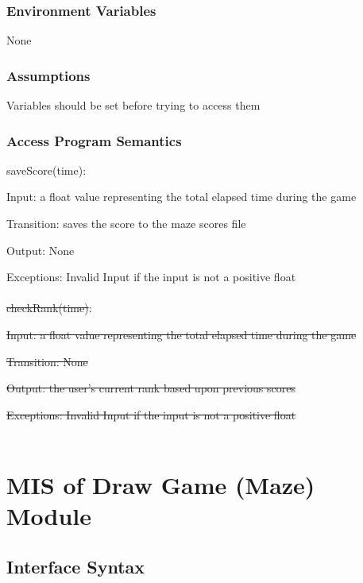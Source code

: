 \documentclass[12pt, titlepage]{article}
\begin{document}
		\subsubsection{Environment Variables}
		None
		\subsubsection{Assumptions}
		Variables should be set before trying to access them
		
		\subsubsection{Access Program Semantics}
		saveScore(time):
		
		Input: a float value representing the total elapsed time during the game
		
		Transition: saves the score to the maze scores file
		
		Output: None
		
		Exceptions: Invalid Input if the input is not a positive float \\
		\\
		\sout{checkRank(time)}:
		
		\sout{Input: a float value representing the total elapsed time during the game}
		
		\sout{Transition: None}
		
		\sout{Output: the user's current rank based upon previous scores}
		
		\sout{Exceptions: Invalid Input if the input is not a positive float}\\
		\\

\section{MIS of Draw Game (Maze) Module}
		\subsection{Interface Syntax}
\end{document}
